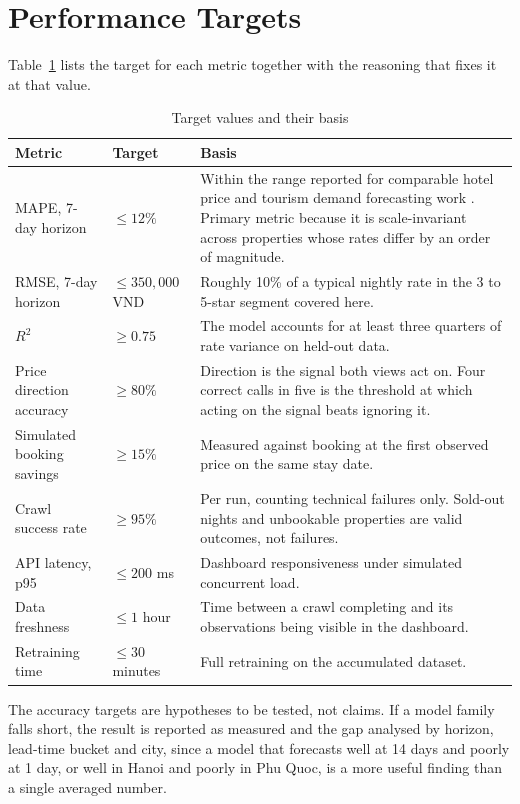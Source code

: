 \section{Performance Targets}

Table~\ref{tab:expected_performance} lists the target for each metric together with the reasoning that fixes it at that value.

\begin{table}[!htbp]
\centering
\caption{Target values and their basis}
\label{tab:expected_performance}
\begin{tabular}{|p{4.4cm}|p{2.6cm}|p{6.6cm}|}
\hline
\textbf{Metric} & \textbf{Target} & \textbf{Basis} \\
\hline
MAPE, 7-day horizon & $\leq 12\%$ & Within the range reported for comparable hotel price and tourism demand forecasting work \cite{law2019, zhang2011}. Primary metric because it is scale-invariant across properties whose rates differ by an order of magnitude. \\
\hline
RMSE, 7-day horizon & $\leq 350{,}000$ VND & Roughly 10\% of a typical nightly rate in the 3 to 5-star segment covered here. \\
\hline
$R^2$ & $\geq 0.75$ & The model accounts for at least three quarters of rate variance on held-out data. \\
\hline
Price direction accuracy & $\geq 80\%$ & Direction is the signal both views act on. Four correct calls in five is the threshold at which acting on the signal beats ignoring it. \\
\hline
Simulated booking savings & $\geq 15\%$ & Measured against booking at the first observed price on the same stay date. \\
\hline
Crawl success rate & $\geq 95\%$ & Per run, counting technical failures only. Sold-out nights and unbookable properties are valid outcomes, not failures. \\
\hline
API latency, p95 & $\leq 200$ ms & Dashboard responsiveness under simulated concurrent load. \\
\hline
Data freshness & $\leq 1$ hour & Time between a crawl completing and its observations being visible in the dashboard. \\
\hline
Retraining time & $\leq 30$ minutes & Full retraining on the accumulated dataset. \\
\hline
\end{tabular}
\end{table}

The accuracy targets are hypotheses to be tested, not claims. If a model family falls short, the result is reported as measured and the gap analysed by horizon, lead-time bucket and city, since a model that forecasts well at 14 days and poorly at 1 day, or well in Hanoi and poorly in Phu Quoc, is a more useful finding than a single averaged number.

